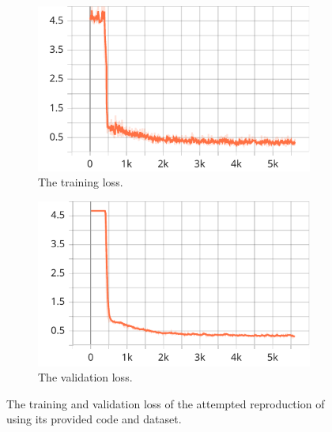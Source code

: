 \begin{figure}
    \centering
    \begin{subfigure}{.45\textwidth}
        \includegraphics[width=\textwidth]{graphics/work-artifacts/im2vec/110_repro/loss.pdf}
        \caption{The training loss.}
    \end{subfigure}
    \begin{subfigure}{.45\textwidth}
        \includegraphics[width=\textwidth]{graphics/work-artifacts/im2vec/110_repro/avg_val_loss.pdf}
        \caption{The validation loss.}
    \end{subfigure}
    \caption{The training and validation loss of the attempted reproduction of \citep{DBLP:conf/cvpr/Reddy21} using its provided code and dataset.}
    \label{fig:110_repro.loss}
\end{figure}

